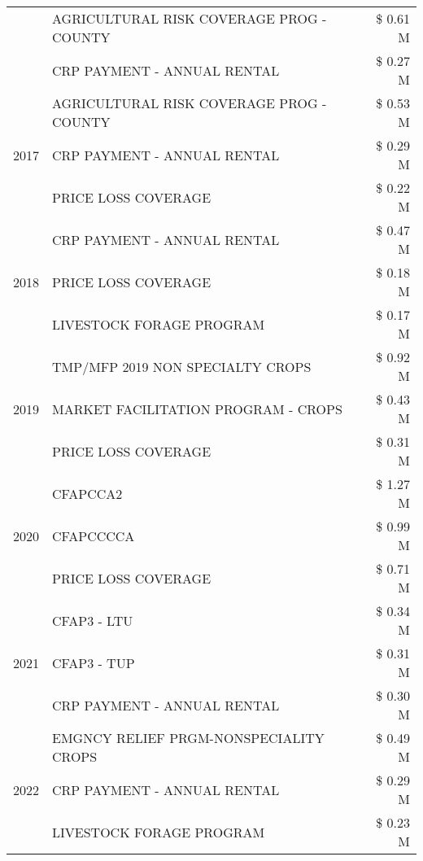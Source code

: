 \begin{tabular}{llr}
 & AGRICULTURAL RISK COVERAGE PROG - COUNTY & \$ 0.61 M \\
 & CRP PAYMENT - ANNUAL RENTAL & \$ 0.27 M \\
\cline{1-3}
\multirow[t]{3}{*}{2017} & AGRICULTURAL RISK COVERAGE PROG - COUNTY & \$ 0.53 M \\
 & CRP PAYMENT - ANNUAL RENTAL & \$ 0.29 M \\
 & PRICE LOSS COVERAGE & \$ 0.22 M \\
\cline{1-3}
\multirow[t]{3}{*}{2018} & CRP PAYMENT - ANNUAL RENTAL & \$ 0.47 M \\
 & PRICE LOSS COVERAGE & \$ 0.18 M \\
 & LIVESTOCK FORAGE PROGRAM & \$ 0.17 M \\
\cline{1-3}
\multirow[t]{3}{*}{2019} & TMP/MFP 2019 NON SPECIALTY CROPS & \$ 0.92 M \\
 & MARKET FACILITATION PROGRAM - CROPS & \$ 0.43 M \\
 & PRICE LOSS COVERAGE & \$ 0.31 M \\
\cline{1-3}
\multirow[t]{3}{*}{2020} & CFAPCCA2 & \$ 1.27 M \\
 & CFAPCCCCA & \$ 0.99 M \\
 & PRICE LOSS COVERAGE & \$ 0.71 M \\
\cline{1-3}
\multirow[t]{3}{*}{2021} & CFAP3 - LTU & \$ 0.34 M \\
 & CFAP3 - TUP & \$ 0.31 M \\
 & CRP PAYMENT - ANNUAL RENTAL & \$ 0.30 M \\
\cline{1-3}
\multirow[t]{3}{*}{2022} & EMGNCY RELIEF PRGM-NONSPECIALITY CROPS & \$ 0.49 M \\
 & CRP PAYMENT - ANNUAL RENTAL & \$ 0.29 M \\
 & LIVESTOCK FORAGE PROGRAM & \$ 0.23 M \\
\cline{1-3}
\bottomrule
\end{tabular}
